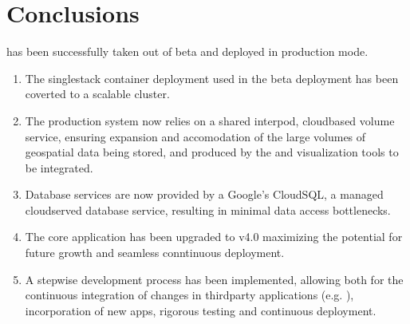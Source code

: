 \documentclass[letterpaper,12pt,english,openany,oneside]{sphinxmanual}
\begin{document}
\chapter{Conclusions}
\label{\detokenize{euidev/conclusions/index:conclusions}}\label{\detokenize{euidev/conclusions/index::doc}}
\sphinxAtStartPar
{} has been successfully taken out of beta and deployed in production mode.
\begin{enumerate}
%
\item {} 
\sphinxAtStartPar
The single\sphinxhyphen{}stack  container deployment used in the beta deployment has been coverted to a scalable  cluster.

\item {} 
\sphinxAtStartPar
The production system now relies on a shared inter\sphinxhyphen{}pod, cloud\sphinxhyphen{}based  volume service, ensuring expansion and accomodation of the large volumes of geospatial data being stored, and produced by the  and visualization tools to be integrated.

\item {} 
\sphinxAtStartPar
Database services are now provided by a Google’s CloudSQL, a managed cloud\sphinxhyphen{}served database service, resulting in minimal data access bottle\sphinxhyphen{}necks.

\item {} 
\sphinxAtStartPar
The core  application has been upgraded to v4.0 maximizing the potential for future growth and seamless conntinuous deployment.

\item {} 
\sphinxAtStartPar
A step\sphinxhyphen{}wise development process has been implemented, allowing both for the continuous integration of changes in third\sphinxhyphen{}party applications (e.g. ), incorporation of new  apps, rigorous testing and continuous deployment.

\end{enumerate}
\end{document}
